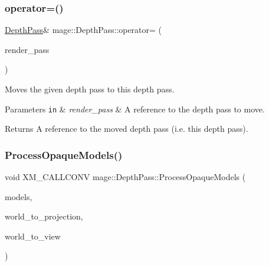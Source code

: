 \subsubsection{\texorpdfstring{operator=()}{operator=()}\hspace{0.1cm}{\footnotesize\ttfamily [2/2]}}
{\footnotesize\ttfamily \hyperlink{classmage_1_1_depth_pass}{Depth\+Pass}\& mage\+::\+Depth\+Pass\+::operator= (\begin{DoxyParamCaption}\item[{\hyperlink{classmage_1_1_depth_pass}{Depth\+Pass} \&\&}]{render\+\_\+pass }\end{DoxyParamCaption})\hspace{0.3cm}{\ttfamily [delete]}}

Moves the given depth pass to this depth pass.


\begin{DoxyParams}[1]{Parameters}
\mbox{\tt in}  & {\em render\+\_\+pass} & A reference to the depth pass to move. \\
\hline
\end{DoxyParams}
\begin{DoxyReturn}{Returns}
A reference to the moved depth pass (i.\+e. this depth pass). 
\end{DoxyReturn}
\hypertarget{classmage_1_1_depth_pass_a2aabb8bd4676a8ce633e5cb91e6b13d9}{}\label{classmage_1_1_depth_pass_a2aabb8bd4676a8ce633e5cb91e6b13d9} 
\subsubsection{\texorpdfstring{Process\+Opaque\+Models()}{ProcessOpaqueModels()}}
{\footnotesize\ttfamily void X\+M\+\_\+\+C\+A\+L\+L\+C\+O\+NV mage\+::\+Depth\+Pass\+::\+Process\+Opaque\+Models (\begin{DoxyParamCaption}\item[{const vector$<$ const \hyperlink{classmage_1_1_model_node}{Model\+Node} $\ast$ $>$ \&}]{models,  }\item[{F\+X\+M\+M\+A\+T\+R\+IX}]{world\+\_\+to\+\_\+projection,  }\item[{C\+X\+M\+M\+A\+T\+R\+IX}]{world\+\_\+to\+\_\+view }\end{DoxyParamCaption})\hspace{0.3cm}{\ttfamily [private]}}

